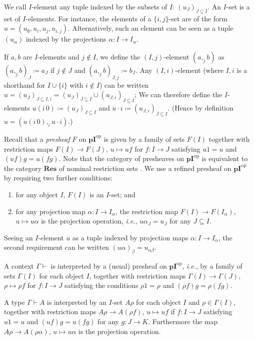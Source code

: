 \documentclass[english]{PaperTools/latex/lipics}
\def\pI{\ensuremath{\mathbf{pI}}}
\def\ie{\textit{i.e.}}
\def\opp{\mathrm{op}}
\begin{document}
\begin{definition}[$I$-set]
  We call $I$-element any tuple indexed by the subsets of $I$: $(u_J)_{J ⊆ I}$.
  An $I$-set is a set of $I$-elements.  For instance, the elements of a
  $\{i,j\}$-set are of the form $u = (u_∅,u_i,u_j,u_{i,j})$.
  Alternatively, such an element can be seen as a tuple $(u_α)$ indexed
  by the projections $α : I → I_α$.
\end{definition}
  If $a,b$ are $I$-elements and $j ∉ I$, we define the $(I,j)$-element
  $(a ,_j b)$ as $(a ,_j b)_J ≔ a_J$ if $j ∉ J$ and $(a ,_j b)_{J,j} ≔ b_J$.
  Any $(I,i)$-element (where $I,i$ is a shorthand for $I ∪ \{i\}$ with
  $i ∉ I$) can be written $u = (u_J)_{J ⊆ I,i} = (u_J)_{J ⊆ I} ∪ (u_{J,i})_{J ⊆ I}$;
  We can therefore define the $I$-elements $u (i\,0) ≔ (u_J)_{J ⊆ I}$ and
  $u · i ≔ (u_{J,i})_{J ⊆ I}$.
  (Hence by definition $u = (u (i\,0) ,_i u · i)$.)

\bigskip
Recall that a \emph{presheaf} $F$ on $\pI^\opp$ is given by a family of
sets $F(I)$ together with restriction maps $F(I) → F(J)$, $u ↦ uf$ for
$f : I → J$ satisfying $u1 = u$ and $(uf)g = u(fg)$.
Note that the category of presheaves on $\pI^\opp$ is equivalent to the
category $\mathbf{Res}$ of nominal restriction sets \cite[rem.~9.9 p.~161]{PittsAM:nomsns}.
%
We use a refined presheaf on $\pI^\opp$ by requiring two further conditions:
%
\begin{enumerate}
  \item for any object $I$, $F(I)$ is an $I$-set; and
  \item for any projection map $α : I → I_α$, the restriction
    map $F(I) → F(I_α)$, $u ↦ uα$ is the projection operation, \ie,
    $uα_J = u_J$ for any $J ⊆ I$.
\end{enumerate}
%
Seeing an $I$-element $u$ as a tuple indexed by projection maps
$α : I → I_α$, the second requirement can be written $(uα)_β = u_{αβ}$.

\bigskip
A context $Γ ⊢$ is interpreted by a (usual) presheaf on $\pI^\opp$, \ie,
by a family of sets $Γ(I)$ for each object $I$, together with
restriction maps $Γ(I) → Γ(J)$, $ρ ↦ ρf$ for $f : I → J$ satisfying the
conditions $ρ1 = ρ$ and $(ρf)g = ρ(fg)$.

\medskip
A type $Γ ⊢ A$ is interpreted by an $I$-set $Aρ$ for each object $I$ and
$ρ ∈ Γ(I)$,
together with restriction maps $Aρ → A(ρf)$, $u ↦ uf$ if $f : I → J$
satisfying $u1 = u$ and $(uf)g = u(fg)$ for any $g : J → K$.
Furthermore the map $Aρ → A(ρα)$, $u ↦ uα$ is the projection operation.
\end{document}
